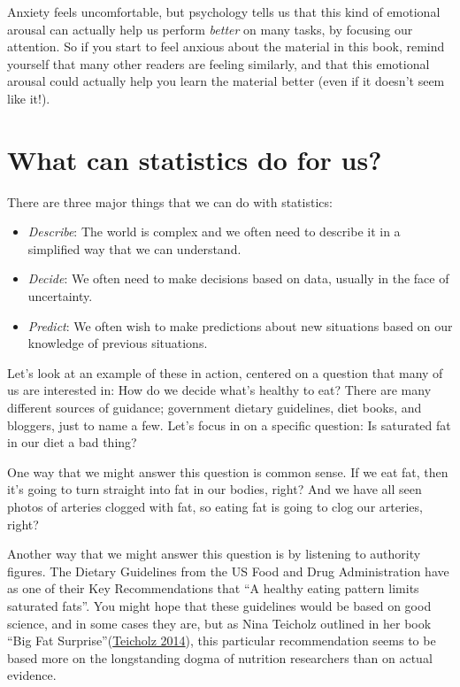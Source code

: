 \documentclass[
  12pt,
]{book}
\providecommand{\tightlist}{%
  \setlength{\itemsep}{0pt}\setlength{\parskip}{0pt}}
\begin{document}
Anxiety feels uncomfortable, but psychology tells us that this kind of emotional arousal can actually help us perform \emph{better} on many tasks, by focusing our attention. So if you start to feel anxious about the material in this book, remind yourself that many other readers are feeling similarly, and that this emotional arousal could actually help you learn the material better (even if it doesn't seem like it!).

\hypertarget{what-can-statistics-do-for-us}{%
\section{What can statistics do for us?}\label{what-can-statistics-do-for-us}}

There are three major things that we can do with statistics:

\begin{itemize}
\tightlist
\item
  \emph{Describe}: The world is complex and we often need to describe it in a simplified way that we can understand.\\
\item
  \emph{Decide}: We often need to make decisions based on data, usually in the face of uncertainty.
\item
  \emph{Predict}: We often wish to make predictions about new situations based on our knowledge of previous situations.
\end{itemize}

Let's look at an example of these in action, centered on a question that many of us are interested in: How do we decide what's healthy to eat? There are many different sources of guidance; government dietary guidelines, diet books, and bloggers, just to name a few. Let's focus in on a specific question: Is saturated fat in our diet a bad thing?

One way that we might answer this question is common sense. If we eat fat, then it's going to turn straight into fat in our bodies, right? And we have all seen photos of arteries clogged with fat, so eating fat is going to clog our arteries, right?

Another way that we might answer this question is by listening to authority figures. The Dietary Guidelines from the US Food and Drug Administration have as one of their Key Recommendations that ``A healthy eating pattern limits saturated fats''. You might hope that these guidelines would be based on good science, and in some cases they are, but as Nina Teicholz outlined in her book ``Big Fat Surprise''(\protect\hyperlink{ref-teic:2014}{Teicholz 2014}), this particular recommendation seems to be based more on the longstanding dogma of nutrition researchers than on actual evidence.
\end{document}
